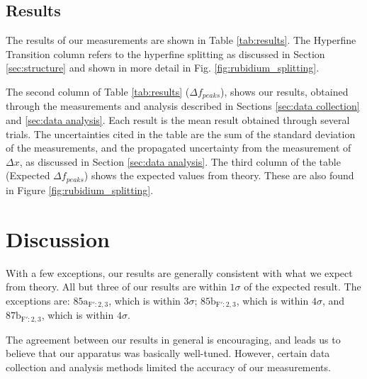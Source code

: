 \documentclass[twocolumn,amsmath,amssymb,pra, floatfix]{revtex4-2}
\begin{document}
\subsection{Results}
The results of our measurements are shown in Table \ref{tab:results}. The Hyperfine Transition column refers to the hyperfine splitting as discussed in Section \ref{sec:structure} and shown in more detail in Fig. \ref{fig:rubidium_splitting}. 


The second column of Table \ref{tab:results} ($\Delta f_{peaks}$), shows our results, obtained through the measurements and analysis described in Sections \ref{sec:data collection} and \ref{sec:data analysis}. Each result is the mean result obtained through several trials. The uncertainties cited in the table are the sum of the standard deviation of the measurements, and the propagated uncertainty from the measurement of $\Delta x$, as discussed in Section \ref{sec:data analysis}. The third column of the table (Expected $\Delta f_{peaks}$) shows the expected values from theory. These are also found in Figure \ref{fig:rubidium_splitting}.   

\section{Discussion}
\label{sec:discussion}
With a few exceptions, our results are generally consistent with what we expect from theory. All but three of our results are within $1 \sigma$ of the expected result. The exceptions are: $85\mathrm{a}_{\mathrm{F}': 2, 3}$, which is within $3 \sigma$; $85\mathrm{b}_{\mathrm{F}': 2, 3}$, which is within $4 \sigma$, and $87\mathrm{b}_{\mathrm{F}': 2, 3}$, which is within $4 \sigma$. 

The agreement between our results in general is encouraging, and leads us to believe that our apparatus was basically well-tuned. However, certain data collection and analysis methods limited the accuracy of our measurements. 
\end{document}
